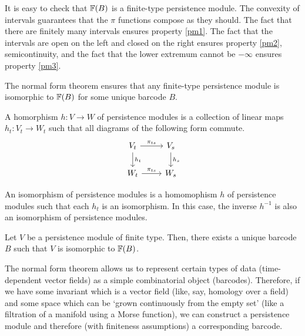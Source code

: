 It is easy to check that $\mathbb{F}(B)$ is a finite-type persistence module. The convexity of intervals guarantees that the $\pi$ functions compose as they should. The fact that there are finitely many intervals ensures property \ref{pm1}. The fact that the intervals are open on the left and closed on the right ensures property \ref{pm2}, semicontinuity, and the fact that the lower extremum cannot be $-\infty$ ensures property \ref{pm3}.

The normal form theorem ensures that any finite-type persistence module is isomorphic to $\mathbb{F}(B)$ for some unique barcode $B$.

\begin{definition}
A homorphism $h \colon V \to W$ of persistence modules is a collection of linear maps $h_t \colon V_t \to W_t$ such that all diagrams of the following form commute.
\begin{equation}
\begin{tikzcd}
V_t \arrow[d, "h_t"] \arrow[r, "\pi_{ts}"] & V_s \arrow[d, "h_s"] \\
W_t \arrow[r, "\pi_{ts}"]                  & W_s                 
\end{tikzcd}
\end{equation}

An isomorphism of persistence modules is a homomophism $h$ of persistence modules such that each $h_t$ is an isomorphism. In this case, the inverse $h^{-1}$ is also an isomorphism of persistence modules.
\end{definition}

\begin{theorem}
Let $V$ be a persistence module of finite type. Then, there exists a unique barcode $B$ such that $V$ is isomorphic to $\mathbb{F}(B)$.
\end{theorem}

The normal form theorem allows us to represent certain types of data (time-dependent vector fields) as a simple combinatorial object (barcodes). Therefore, if we have some invariant which is a vector field (like, say, homology over a field) and some space which can be `grown continuously from the empty set' (like a filtration of a manifold using a Morse function), we can construct a persistence module and therefore (with finiteness assumptions) a corresponding barcode.